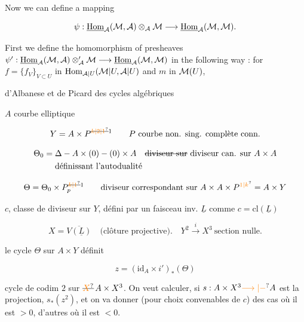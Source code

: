 Now we can define a mapping

\[
\psi:\underline{\mathrm{Hom}}_{\mathcal{A}}(\mathcal{M},\mathcal{A})\otimes_{\mathcal{A}}\mathcal{M}\longrightarrow \underline{\mathrm{Hom}}_{\mathcal{A}}(\mathcal{M},\mathcal{M}).
\]

First we define the homomorphism of presheaves
$\psi':\underline{\mathrm{Hom}}_{\mathcal{A}}(\mathcal{M},\mathcal{A})\otimes_{\mathcal{A}}^{\prime}\mathcal{M}\longrightarrow \underline{\mathrm{Hom}}_{\mathcal{A}}(\mathcal{M},\mathcal{M})$ in the following way : for
$f=\{f_V\}_{V\subset U}$ in $\mathrm{Hom}_{\mathcal{A}|U}(\mathcal{M}|U,\mathcal{A}|U)$ and $m$ in $\mathcal{M}(U)$,

 d'Albanese et de Picard des cycles algébriques


$A$ courbe elliptique

\[
Y=A\times P^{\deleted{\unsure{k|2|1}}1}\qquad\text{$P$ courbe non. sing. complète conn.}
\]

\[
\begin{aligned}
\Theta_0={}&\Delta-A\times(0)-(0)\times A\quad\text{\deleted{diviseur sur} diviseur can. sur } A\times A\\
&\text{définissant l'autodualité}
\end{aligned}
\]

\[
\Theta=\Theta_0\times P^{\deleted{\unsure{k|1}}1}_{p}\qquad\text{diviseur correspondant sur }A\times A\times P^{\unsure{1|k}}=A\times Y
\]

$c$, classe de diviseur sur $Y$, défini par un  faisceau inv. $\underline L$ comme $c=\mathrm{cl}(\underline L)$

\[
X=\overline{V(\underline L)}\quad\text{(clôture projective)}.\quad Y^2\xrightarrow{i}X^3\ \text{section nulle.}
\]

le cycle $\Theta$ sur $A\times Y$ définit

\[
z=(\mathrm{id}_A\times i')_*(\Theta)
\]

cycle de codim $2$ sur $\deleted{\unsure{X}}\,A\times X^3$. On veut calculer, si $s:A\times X^3\unsure{\longrightarrow|-}A$ est la projection, $s_*(z^2)$, et on va donner (pour  choix convenables de $c$) des cas où il est $>0$, d'autres où il est $<0$.

